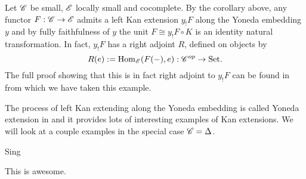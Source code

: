 \documentclass[../../thesis.tex]{subfiles}
\begin{document}
\begin{example}
    Let $\mathscr{C}$ be small, $\mathscr{E}$ locally small and cocomplete.
    By the corollary above, any functor $F: \mathscr{C} \to \mathscr{E}$ admits a left Kan extension $y_!F$ along the Yoneda embedding $y$ and by fully faithfulness of $y$ the unit $F \cong y_!F\circ K$ is an identity natural transformation.
    In fact, $y_!F$ has a right adjoint $R$, defined on objects by
    \[
        R(e) : = \mathrm{Hom}_{\mathscr{E}}(F({-}), e) : \mathscr{C}^{op} \to \mathrm{Set}.
    \]
    The full proof showing that this is in fact right adjoint to $y_!F$ can be found in \cite[Remark 6.5.9.]{CatContext} from which we have taken this example.
\end{example}
The process of left Kan extending along the Yoneda embedding is called Yoneda extension in \cite[pp.62-64]{CatsSheaves} and it provides lots of interesting examples of Kan extensions.
We will look at a couple examples in the special case $\mathscr{C} = \Delta$.
\begin{example}
    Sing
\end{example}
\begin{example}
    This is awesome.
\end{example}
\end{document}
